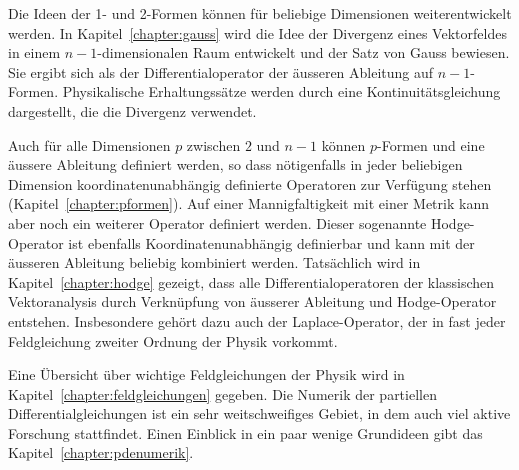 Die Ideen der 1- und 2-Formen können für beliebige Dimensionen
weiterentwickelt werden.
In Kapitel~\ref{chapter:gauss} wird die Idee der Divergenz eines
Vektorfeldes in einem $n-1$-dimensionalen Raum entwickelt und der
Satz von Gauss bewiesen.
%
Sie ergibt sich als der Differentialoperator der äusseren Ableitung
auf $n-1$-Formen.
Physikalische Erhaltungssätze werden durch eine Kontinuitätsgleichung
%
%
dargestellt, die die Divergenz verwendet.

Auch für alle Dimensionen $p$ zwischen $2$ und $n-1$ können $p$-Formen und
eine äussere Ableitung definiert werden, so dass nötigenfalls 
in jeder beliebigen Dimension koordinatenunabhängig definierte
Operatoren zur Verfügung stehen (Kapitel~\ref{chapter:pformen}).
Auf einer Mannigfaltigkeit mit einer Metrik kann aber noch ein weiterer
Operator definiert werden.
Dieser sogenannte Hodge-Operator ist ebenfalls Koordinatenunabhängig
%
definierbar und kann mit der äusseren Ableitung beliebig kombiniert
werden.
%
Tatsächlich wird in Kapitel~\ref{chapter:hodge} gezeigt, dass alle
Differentialoperatoren der klassischen Vektoranalysis durch Verknüpfung
von äusserer Ableitung und Hodge-Operator entstehen.
Insbesondere gehört dazu auch der Laplace-Operator, der in fast
%
jeder Feldgleichung zweiter Ordnung der Physik vorkommt.

Eine Übersicht über wichtige Feldgleichungen der Physik wird
in Kapitel~\ref{chapter:feldgleichungen} gegeben.
Die Numerik der partiellen Differentialgleichungen ist ein sehr
weitschweifiges Gebiet, in dem auch viel aktive Forschung stattfindet.
Einen Einblick in ein paar wenige Grundideen gibt das
Kapitel~\ref{chapter:pdenumerik}.

